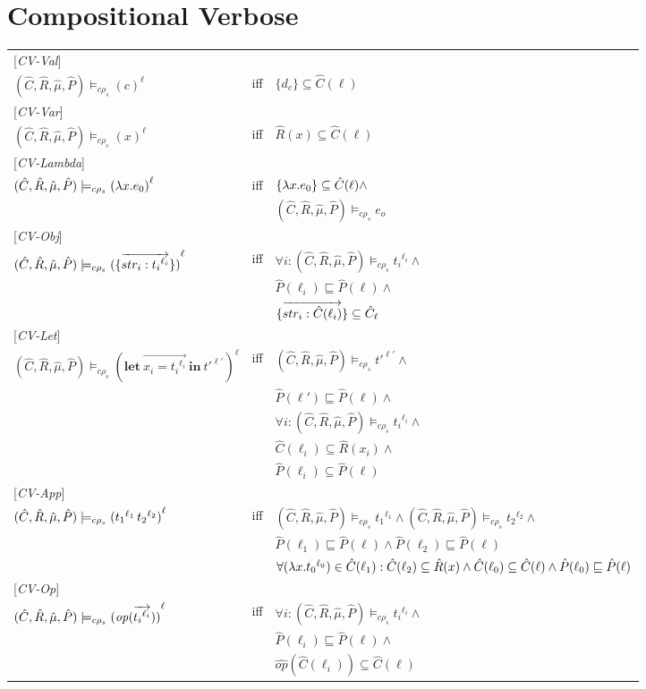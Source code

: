 \documentclass[[12pt,a4paper,twoside,openrigh]{article}
\newcommand{\Cat}[0]{\hat{C}}
\newcommand{\muat}[0]{\hat{\mu}}
\newcommand{\Rat}[0]{\hat{R}}
\newcommand{\Pat}[0]{\hat{P}}
\newcommand{\cenvs}{(\Cat,\Rat,\muat,\Pat)}
\newcommand{\ccest}[1]{\cenvs \models_{c \rho_s} #1}
\newcommand{\ccestl}[1]{\cenvs \models_{c \rho_s} {(#1)}^{\ell}}
\newcommand{\lbt}[1]{{t_#1}^{\ell_#1}}
\newcommand{\letexprs}[3]{\mathbf{let}\ \vec{#1 = #2}\ \mathbf{in}\ #3}
\begin{document}
\section{Compositional Verbose}
\begin{tabular}{l l l}
{[\textit{CV-Val}]} \\
$ \ccestl {c} $ & iff & $\{d_c\} \subseteq \Cat(\ell)$ \\ 
{[\textit{CV-Var}]} \\
$ \ccestl {x} $ & iff & $\Rat(x) \subseteq \Cat(\ell)$ \\ 
{[\textit{CV-Lambda}]} \\
$ \ccestl {\lam{x}{e_0}} $ & iff & $\{\lam{x}{e_0}\} \subseteq \Cat(\ell) \wedge $\\
&& $ \ccest {e_o}$ \\
{[\textit{CV-Obj}]} \\
$ \ccestl {\rec{\vec{str_i : \lbt i}}}$ & iff & $\forall i: \ccest {\lbt i} \wedge$\\
&& $ \Pat(\ell_i) \sqsubseteq \Pat(\ell) \wedge$\\ 
&& $\rec{\vec{str_i : \Cat(\ell_i)}} \subseteq \Cat_\ell $ \\
{[\textit{CV-Let}]} \\
$ \ccestl {\letexprs{x_i}{\lbt i}{{t'}^{\ell'}}}$ & iff & $ \ccest {{t'}^{\ell'}} \wedge$ \\
&& $ \Pat(\ell') \sqsubseteq \Pat(\ell) \wedge$\\
&& $ \forall i: \ccest {{t_i}^{\ell_i}} \wedge$ \\
&& $ \Cat(\ell_i) \subseteq \Rat(x_i) \wedge$ \\
&& $ \Pat(\ell_i) \subseteq \Pat(\ell) $ \\
{[\textit{CV-App}]} \\
$ \ccestl {\appl {\lbt 1} {\lbt 2}}$ & iff & $ \ccest {\lbt 1} \wedge \ccest {\lbt 2} \wedge$ \\
&& $\Pat(\ell_1) \sqsubseteq \Pat(\ell) \wedge \Pat(\ell_2) \sqsubseteq \Pat(\ell)$ \\
&& $\forall (\lam{x}{\lbt 0}) \in \Cat(\ell_1) : \Cat(\ell_2) \subseteq \Rat(x) \wedge \Cat(\ell_0) \subseteq \Cat(\ell) \wedge \Pat(\ell_0) \sqsubseteq \Pat(\ell) $\\
{[\textit{CV-Op}]} \\
$ \ccestl {\op (\vec{\lbt i})} $& iff &$\forall i : \ccest {\lbt i} \wedge $\\
&& $\Pat(\ell_i) \sqsubseteq \Pat(\ell) \wedge$\\
&& $\widehat{op} (\Cat(\ell_i)) \subseteq \Cat(\ell) $\\

\end{tabular}
\end{document}
